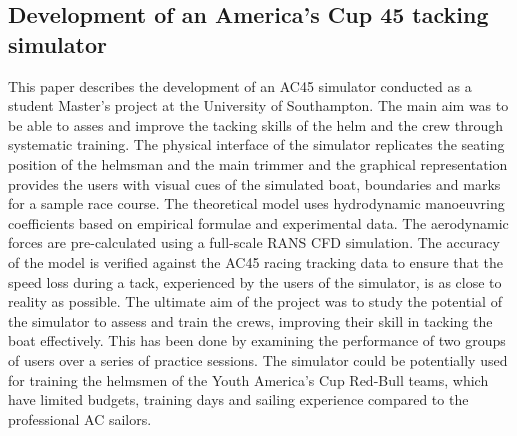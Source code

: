 \documentclass[a4paper,10pt]{article}
\begin{document}
\subsection{Development of an America's Cup 45 tacking simulator \cite{Lidtke2013}}

	This paper describes the development of an AC45 simulator conducted as a student Master’s project at the University of Southampton. The main aim was to be able to asses and improve the tacking skills of the helm and the crew through systematic training. The physical interface of the simulator replicates the seating position of the helmsman and the main trimmer and the graphical representation provides the users with visual cues of the simulated boat, boundaries and marks for a sample race course. The theoretical model uses hydrodynamic manoeuvring coefficients based on empirical formulae and experimental data. The aerodynamic forces are pre-calculated using a full-scale RANS CFD simulation. The accuracy of the model is verified against the AC45 racing tracking data to ensure that the speed loss during a tack, experienced by the users of the simulator, is as close to reality as possible. The ultimate aim of the project was to study the potential of the simulator to assess and train the crews, improving their skill in tacking the boat effectively. This has been done by examining the performance of two groups of users over a series of practice sessions. The simulator could be potentially used for training the helmsmen of the Youth America’s Cup Red-Bull teams, which have limited budgets, training days and sailing experience compared to the professional AC sailors.


\clearpage
{
{}

}


\end{document}
